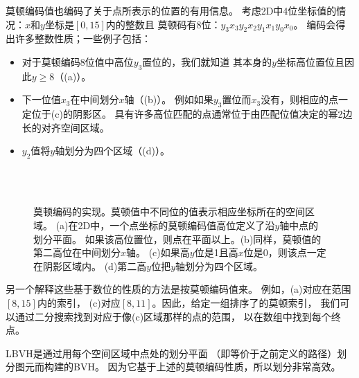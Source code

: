 莫顿编码值也编码了关于点所表示的位置的有用信息。
考虑2D中4位坐标值的情况：$x$和$y$坐标是$[0,15]$内的整数且
莫顿码有8位：$y_3x_3y_2x_2y_1x_1y_0x_0$。
编码会得出许多整数性质；一些例子包括：
\begin{itemize}
    \item 对于莫顿编码8位值中高位$y_3$置位的，我们就知道
          其本身的$y$坐标高位置位且因此$y\ge8$（(a)）。
    \item 下一位值$x_3$在中间划分$x$轴（(b)）。
          例如如果$y_3$置位而$x_3$没有，则相应的点一定位于(c)的阴影区。
          具有许多高位匹配的点通常位于由匹配位值决定的幂2边长的对齐空间区域。
    \item $y_2$值将$y$轴划分为四个区域（(d)）。
\end{itemize}
\begin{figure}[htb]
    \centering\\
    
    
    \\
    
    \caption{莫顿编码的实现。莫顿值中不同位的值表示相应坐标所在的空间区域。
        (a)在2D中，一个点坐标的莫顿编码值高位定义了沿$y$轴中点的划分平面。
        如果该高位置位，则点在平面以上。(b)同样，莫顿值的第二高位在中间划分$x$轴。
        (c)如果高$y$位是1且高$x$位是0，则该点一定在阴影区域内。
        (d)第二高$y$位把$y$轴划分为四个区域。}
    \label{fig:4.8}
\end{figure}

另一个解释这些基于数位的性质的方法是按莫顿编码值来。
例如，(a)对应在范围$[8,15]$内的索引，
(c)对应$[8,11]$。因此，给定一组排序了的莫顿索引，
我们可以通过二分搜索找到对应于像(c)区域那样的点的范围，
以在数组中找到每个终点。

LBVH是通过用每个空间区域中点处的划分平面
（即等价于之前定义的路径）划分图元而构建的BVH。
因为它基于上述的莫顿编码性质，所以划分非常高效。

